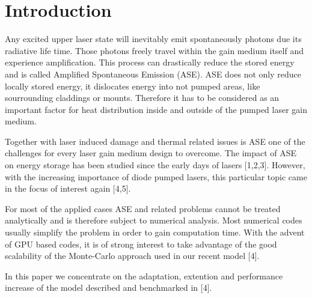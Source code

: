 \section{Introduction}

Any excited upper laser state will inevitably emit spontaneously photons due
its radiative life time. Those photons freely travel within the gain medium
itself and experience amplification. This process can drastically reduce the
stored energy and is called Amplified Spontaneous Emission (ASE). ASE does not
only reduce locally stored energy, it dislocates energy into not pumped areas,
like sourrounding claddings or mounts. Therefore it has to be considered as an
important factor for heat distribution inside and outside of the pumped laser
gain medium.

Together with laser induced damage and thermal related issues is ASE one of the
challenges for every laser gain medium design to overcome. The impact of ASE on
energy storage has been studied since the early days of lasers [1,2,3].
However, with the increasing importance of diode pumped lasers, this particular
topic came in the focus of interest again [4,5].

For most of the applied cases ASE and related problems cannot be treated
analytically and is therefore subject to numerical analysis. Most numerical
codes usually simplify the problem in order to gain computation time. With the
advent of GPU based codes, it is of strong interest to take advantage of the
good scalability of the Monte-Carlo approach used in our recent model [4].

In this paper we concentrate on the adaptation, extention and performance
increase of the model described and benchmarked in [4].
